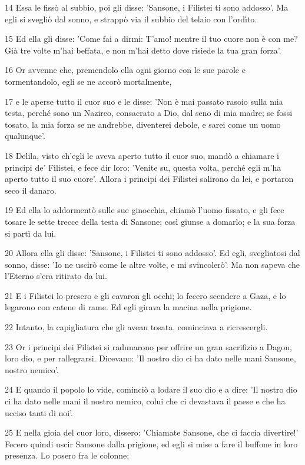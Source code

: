 \par 14 Essa le fissò al subbio, poi gli disse: 'Sansone, i Filistei ti sono addosso'. Ma egli si svegliò dal sonno, e strappò via il subbio del telaio con l'ordìto.
\par 15 Ed ella gli disse: 'Come fai a dirmi: T'amo! mentre il tuo cuore non è con me? Già tre volte m'hai beffata, e non m'hai detto dove risiede la tua gran forza'.
\par 16 Or avvenne che, premendolo ella ogni giorno con le sue parole e tormentandolo, egli se ne accorò mortalmente,
\par 17 e le aperse tutto il cuor suo e le disse: 'Non è mai passato rasoio sulla mia testa, perché sono un Nazireo, consacrato a Dio, dal seno di mia madre; se fossi tosato, la mia forza se ne andrebbe, diventerei debole, e sarei come un uomo qualunque'.
\par 18 Delila, visto ch'egli le aveva aperto tutto il cuor suo, mandò a chiamare i principi de' Filistei, e fece dir loro: 'Venite su, questa volta, perché egli m'ha aperto tutto il suo cuore'. Allora i principi dei Filistei salirono da lei, e portaron seco il danaro.
\par 19 Ed ella lo addormentò sulle sue ginocchia, chiamò l'uomo fissato, e gli fece tosare le sette trecce della testa di Sansone; così giunse a domarlo; e la sua forza si partì da lui.
\par 20 Allora ella gli disse: 'Sansone, i Filistei ti sono addosso'. Ed egli, svegliatosi dal sonno, disse: 'Io ne uscirò come le altre volte, e mi svincolerò'. Ma non sapeva che l'Eterno s'era ritirato da lui.
\par 21 E i Filistei lo presero e gli cavaron gli occhi; lo fecero scendere a Gaza, e lo legarono con catene di rame. Ed egli girava la macina nella prigione.
\par 22 Intanto, la capigliatura che gli avean tosata, cominciava a ricrescergli.
\par 23 Or i principi dei Filistei si radunarono per offrire un gran sacrifizio a Dagon, loro dio, e per rallegrarsi. Dicevano: 'Il nostro dio ci ha dato nelle mani Sansone, nostro nemico'.
\par 24 E quando il popolo lo vide, cominciò a lodare il suo dio e a dire: 'Il nostro dio ci ha dato nelle mani il nostro nemico, colui che ci devastava il paese e che ha ucciso tanti di noi'.
\par 25 E nella gioia del cuor loro, dissero: 'Chiamate Sansone, che ci faccia divertire!' Fecero quindi uscir Sansone dalla prigione, ed egli si mise a fare il buffone in loro presenza. Lo posero fra le colonne;
